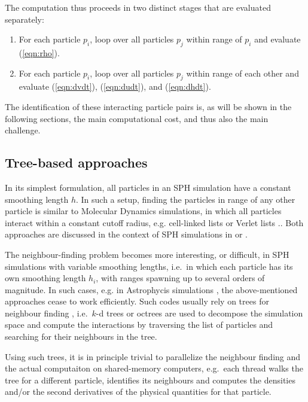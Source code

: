 \documentclass[final]{siamltex}
\newcommand{\eqn}[1]
    {(\ref{eqn:#1})}
\begin{document}
The computation thus proceeds in two distinct stages that are
evaluated separately:
\begin{enumerate}
    \item For each particle $p_i$,
    loop over all particles $p_j$ within range of $p_i$ and evaluate
    \eqn{rho}.
    \item For each particle $p_i$, loop over all particles $p_j$
        within range of each other and evaluate \eqn{dvdt}, \eqn{dudt},
        and \eqn{dhdt}.
\end{enumerate}
The identification of these interacting particle pairs is,
as will be shown in the following sections, the main computational
cost, and thus also the main challenge. 


\subsection{Tree-based approaches}

In its simplest formulation, all particles in an SPH simulation have
a constant smoothing length $h$.
In such a setup, finding the particles in range of any other particle
is similar to Molecular Dynamics simulations, in which all particles
interact within a constant cutoff radius, e.g. cell-linked lists
\cite{ref:Allen1989} or Verlet lists \cite{ref:Verlet1967}..
Both approaches are discussed in the context of SPH simulations
in \cite{ref:Dominguez2011} or \cite{ref:Viccione2008}.

The neighbour-finding problem becomes more interesting, or difficult,
in SPH simulations with variable smoothing lengths, i.e.~in which
each particle has its own smoothing length $h_i$, with ranges spawning
up to several orders of magnitude.
In such cases, e.g. in Astrophycis simulations \cite{ref:Gingold1977},
the above-mentioned approaches cease to work efficiently.
Such codes usually rely on
trees for neighbour finding \cite{ref:Hernquist1989,ref:Springel2005,ref:Wadsley2004},
i.e.~$k$-d trees \cite{ref:Bentley1975} or octrees \cite{ref:Meagher1982}
are used to decompose the simulation space and compute the
interactions by traversing the list of particles and searching
for their neighbours in the tree.

Using such trees, it is in principle trivial to parallelize
the neighbour finding and the actual computaiton on shared-memory
computers,
e.g.~each thread walks the tree for a different particle,
identifies its neighbours and computes the densities and/or
the second derivatives of the physical quantities for that particle.
\end{document}
